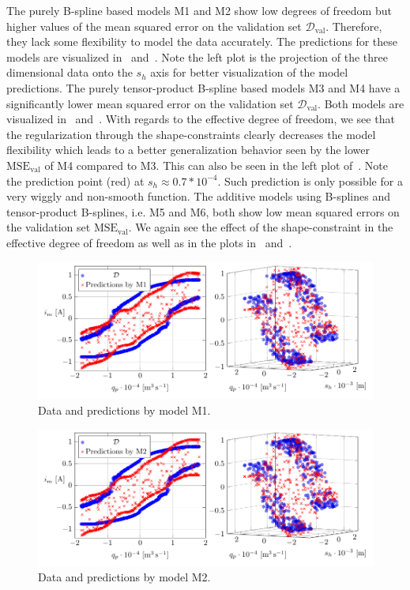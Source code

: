 The purely B-spline based models M1 and M2 show low degrees of freedom but higher values of the mean squared error on the validation set $\mathcal{D}_{\text{val}}$. Therefore, they lack some flexibility to model the data accurately. The predictions for these models are visualized in~ and~. Note the left plot is the projection of the three dimensional data onto the $s_h$ axis for better visualization of the model predictions. The purely tensor-product B-spline based models M3 and M4 have a significantly lower mean squared error on the validation set $\mathcal{D}_{\text{val}}$. Both models are visualized in~ and~. With regards to the effective degree of freedom, we see that the regularization through the shape-constraints clearly decreases the model flexibility which leads to a better generalization behavior seen by the lower $\text{MSE}_{\text{val}}$ of M4 compared to M3. This can also be seen in the left plot of~. Note the prediction point (red) at $s_h \approx 0.7*10^{-4}$. Such prediction is only possible for a very wiggly and non-smooth function. The additive models using B-splines and tensor-product B-splines, i.e. M5 and M6, both show low mean squared errors on the validation set $\text{MSE}_{\text{val}}$. We again see the effect of the shape-constraint in the effective degree of freedom as well as in the plots in~ and~. 

\begin{figure}[H]
	\centering 
	\includegraphics{graphics/pgfplots/cha5/Bosch/M1.pdf}
	\caption{Data and predictions by model M1.}
	\label{fig:bosch-M1}
\end{figure}

\begin{figure}[H]
	\centering 
	\includegraphics{graphics/pgfplots/cha5/Bosch/M2.pdf}
	\caption{Data and predictions by model M2.}
	\label{fig:bosch-M2}
\end{figure}

